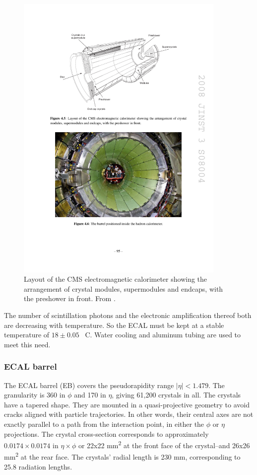 \begin{figure}
\centering
\includegraphics[width=0.9\textwidth]{figures/ecal_layout.pdf}
\caption{Layout of the CMS electromagnetic calorimeter showing the arrangement of crystal
modules, supermodules and endcaps, with the preshower in front. From \cite{Chatrchyan:2008aa}.}
\label{fig:ecal_layout}
\end{figure}

The number of scintillation photons and the electronic amplification thereof both are decreasing with temperature. 
So the ECAL must be kept at a stable temperature of $18\pm0.05$\textdegree~ C.
Water cooling and aluminum tubing are used to meet this need.

\subsubsection{ECAL barrel}
The ECAL barrel (EB) covers the pseudorapidity range $|\eta|<1.479$.
The granularity is 360 in $\phi$ and 170 in $\eta$, giving 61,200 crystals in all.
The crystals have a tapered shape.
They are mounted in a quasi-projective geometry to avoid cracks aligned with particle trajectories.
In other words, their central axes are not exactly parallel to a path from the interaction point, 
in either the $\phi$ or $\eta$ projections.
The crystal cross-section corresponds to approximately $0.0174 \times 0.0174$ in $\eta\times\phi$
or 22x22 mm\textsuperscript{2} at the front face of the crystal--and 26x26 mm\textsuperscript{2}
at the rear face.
The crystals' radial length is 230 mm, corresponding to 25.8 radiation lengths.

